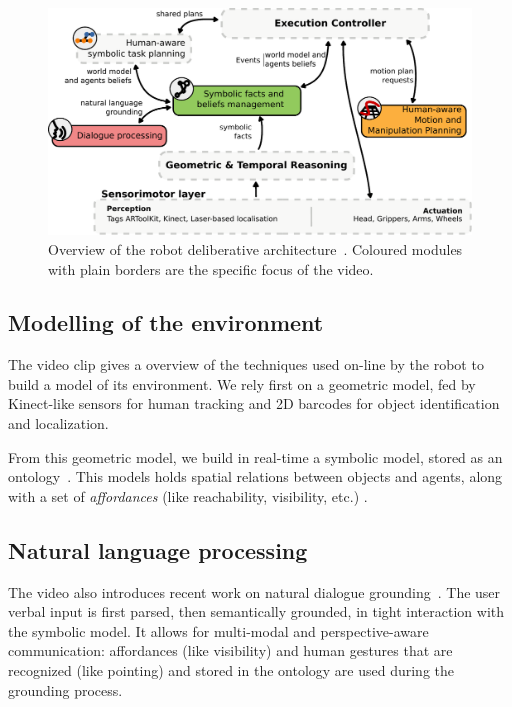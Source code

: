 \documentclass[conference]{IEEEtran}
\begin{document}
\begin{figure}[h!]
        \centering
        \includegraphics[width=0.9\columnwidth]{archi}
        \caption{Overview of the robot deliberative
        architecture~\cite{Alami2011a}. Coloured modules with plain borders are
        the specific focus of the video.}
        \label{fig|archi}
\end{figure}

\subsection{Modelling of the environment}

The video clip gives a overview of the techniques used on-line by the robot
to build a model of its environment. We rely first on a geometric model, fed by
Kinect-like sensors for human tracking and 2D barcodes for object identification
and localization.

From this geometric model, we build in real-time a symbolic model, stored as an
ontology~\cite{Lemaignan2010}. This models holds spatial relations between
objects and agents, along with a set of \emph{affordances} (like reachability,
visibility, etc.) \cite{Lemaignan2011a}.

\subsection{Natural language processing}

The video also introduces recent work on natural dialogue
grounding~\cite{Lemaignan2011a}. The user verbal input is first parsed, then
semantically grounded, in tight interaction with the symbolic model. It allows
for multi-modal and perspective-aware communication: affordances (like
visibility) and human gestures that are recognized (like pointing) and stored
in the ontology are used during the grounding process.
\end{document}
